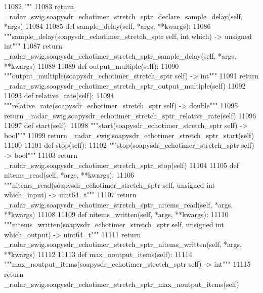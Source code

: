 \begin{DoxyCode}
{{{{{{{{{{{{{{{{{{{{{{{{{{{{{{{{{{{11082 \textcolor{stringliteral}{        """}
11083         \textcolor{keywordflow}{return} \_radar\_swig.soapysdr\_echotimer\_stretch\_sptr\_declare\_sample\_delay(self, *args)
11084 
11085     \textcolor{keyword}{def }sample_delay(self, *args, **kwargs):
11086         \textcolor{stringliteral}{"""sample\_delay(soapysdr\_echotimer\_stretch\_sptr self, int which) -> unsigned int"""}
11087         \textcolor{keywordflow}{return} \_radar\_swig.soapysdr\_echotimer\_stretch\_sptr\_sample\_delay(self, *args, **kwargs)
11088 
11089     \textcolor{keyword}{def }output_multiple(self):
11090         \textcolor{stringliteral}{"""output\_multiple(soapysdr\_echotimer\_stretch\_sptr self) -> int"""}
11091         \textcolor{keywordflow}{return} \_radar\_swig.soapysdr\_echotimer\_stretch\_sptr\_output\_multiple(self)
11092 
11093     \textcolor{keyword}{def }relative_rate(self):
11094         \textcolor{stringliteral}{"""relative\_rate(soapysdr\_echotimer\_stretch\_sptr self) -> double"""}
11095         \textcolor{keywordflow}{return} \_radar\_swig.soapysdr\_echotimer\_stretch\_sptr\_relative\_rate(self)
11096 
11097     \textcolor{keyword}{def }start(self):
11098         \textcolor{stringliteral}{"""start(soapysdr\_echotimer\_stretch\_sptr self) -> bool"""}
11099         \textcolor{keywordflow}{return} \_radar\_swig.soapysdr\_echotimer\_stretch\_sptr\_start(self)
11100 
11101     \textcolor{keyword}{def }stop(self):
11102         \textcolor{stringliteral}{"""stop(soapysdr\_echotimer\_stretch\_sptr self) -> bool"""}
11103         \textcolor{keywordflow}{return} \_radar\_swig.soapysdr\_echotimer\_stretch\_sptr\_stop(self)
11104 
11105     \textcolor{keyword}{def }nitems_read(self, *args, **kwargs):
11106         \textcolor{stringliteral}{"""nitems\_read(soapysdr\_echotimer\_stretch\_sptr self, unsigned int which\_input) -> uint64\_t"""}
11107         \textcolor{keywordflow}{return} \_radar\_swig.soapysdr\_echotimer\_stretch\_sptr\_nitems\_read(self, *args, **kwargs)
11108 
11109     \textcolor{keyword}{def }nitems_written(self, *args, **kwargs):
11110         \textcolor{stringliteral}{"""nitems\_written(soapysdr\_echotimer\_stretch\_sptr self, unsigned int which\_output) -> uint64\_t"""}
11111         \textcolor{keywordflow}{return} \_radar\_swig.soapysdr\_echotimer\_stretch\_sptr\_nitems\_written(self, *args, **kwargs)
11112 
11113     \textcolor{keyword}{def }max_noutput_items(self):
11114         \textcolor{stringliteral}{"""max\_noutput\_items(soapysdr\_echotimer\_stretch\_sptr self) -> int"""}
11115         \textcolor{keywordflow}{return} \_radar\_swig.soapysdr\_echotimer\_stretch\_sptr\_max\_noutput\_items(self)
}}}}}}}}}}}}}}}}}}}}}}}}}}}}}}}}}}}
\end{DoxyCode}
